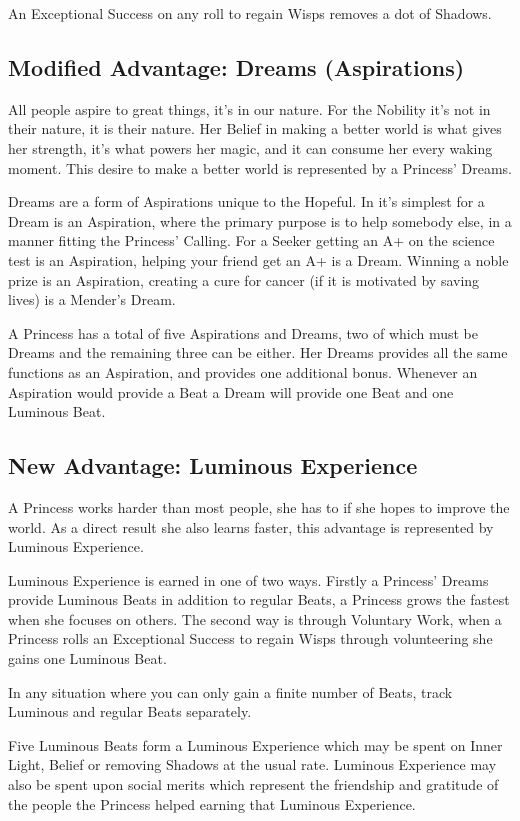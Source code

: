 An Exceptional Success on any roll to regain Wisps removes a dot of Shadows.

\subsection*{Modified Advantage: Dreams (Aspirations)}

All people aspire to great things, it's in our nature. For the Nobility it's not in their nature, it is their nature. Her Belief in making a better world is what gives her strength, it's what powers her magic, and it can consume her every waking moment. This desire to make a better world is represented by a Princess' Dreams. 


Dreams are a form of Aspirations unique to the Hopeful. In it's simplest for a Dream is an Aspiration, where the primary purpose is to help somebody else, in a manner fitting the Princess' Calling. For a Seeker getting an A+ on the science test is an Aspiration, helping your friend get an A+ is a Dream. Winning a noble prize is an Aspiration, creating a cure for cancer (if it is motivated by saving lives) is a Mender's Dream. 

A Princess has a total of five Aspirations and Dreams, two of which must be Dreams and the remaining three can be either. Her Dreams provides all the same functions as an Aspiration, and provides one additional bonus. Whenever an Aspiration would provide a Beat a Dream will provide one Beat and one Luminous Beat. 

\subsection*{New Advantage: Luminous Experience}

A Princess works harder than most people, she has to if she hopes to improve the world. As a direct result she also learns faster, this advantage is represented by Luminous Experience. 

Luminous Experience is earned in one of two ways. Firstly a Princess' Dreams provide Luminous Beats in addition to regular Beats, a Princess grows the fastest when she focuses on others. The second way is through Voluntary Work, when a Princess rolls an Exceptional Success to regain Wisps through volunteering she gains one Luminous Beat.

In any situation where you can only gain a finite number of Beats, track Luminous and regular Beats separately. 

Five Luminous Beats form a Luminous Experience which may be spent on Inner Light, Belief or removing Shadows at the usual rate. Luminous Experience may also be spent upon social merits which represent the friendship and gratitude of the people the Princess helped earning that Luminous Experience. 

